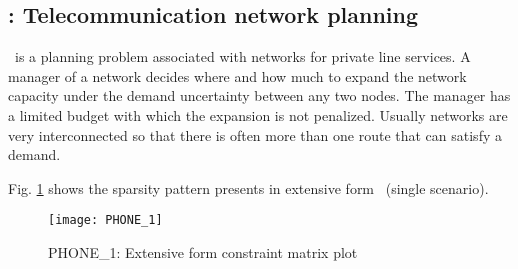 \subsection{\phone: Telecommunication network planning} \label{PHONE}
\phone\ is a planning problem associated with networks for private line services. A manager of a network decides where and how much to expand the network capacity under the demand uncertainty between any two nodes. The manager has a limited budget with which the expansion is not penalized. Usually networks are very interconnected so that there is often more than one route that can satisfy a demand.

Fig. \ref{fig:phone_sparsity} shows the sparsity pattern presents in extensive form \phone\ (single scenario).
\begin{figure}[H]
	\centering
	\texttt{[image: PHONE\_1]}
	\caption{PHONE\_1: Extensive form constraint matrix plot}
	\label{fig:phone_sparsity}
\end{figure}
